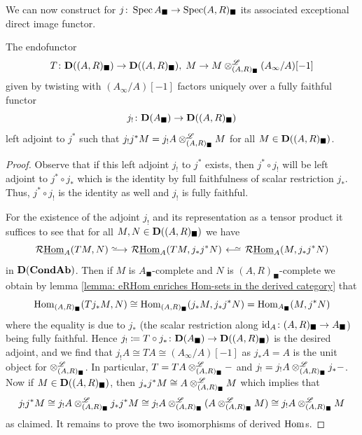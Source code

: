 We can now construct for $j\colon \operatorname{Spec} A_\blacksquare \to \operatorname{Spec} (A, R)_\blacksquare$ its associated exceptional direct image functor. 
\begin{lemma}
	\label{lemma: the left adjoint of completed scalar extension}
	
	The endofunctor
		$$T\colon {{\mathbf{D}}((A, R)_\blacksquare)}\to{{\mathbf{D}}((A, R)_\blacksquare)},\;M\to M\otimes^{\mathscr{L}}_{(A, R)_\blacksquare} (A_\infty/A)[-1]$$
	given by twisting with $(A_\infty/A)[-1]$ factors uniquely over a fully faithful functor
		$$j_!\colon {{\mathbf{D}}(A_\blacksquare)}\to{{\mathbf{D}}((A, R)_\blacksquare)}$$
	left adjoint to $j^\ast$ such that $j_! j^\ast M = j_! A \otimes^{\mathscr{L}}_{(A, R)_\blacksquare} M$ for all $M\in{{\mathbf{D}}((A, R)_\blacksquare)}$.
\end{lemma}
\begin{proof}
	Observe that if this left adjoint $j_!$ to $j^\ast$ exists, then $j^\ast\circ j_!$ will be left adjoint to $j^\ast \circ j_\ast$ which is the identity by full faithfulness of scalar restriction $j_\ast$. Thus, $j^\ast\circ j_!$ is the identity as well and $j_!$ is fully faithful.
	
	For the existence of the adjoint $j_!$ and its representation as a tensor product it suffices to see that for all $M, N \in {{\mathbf{D}}((A, R)_\blacksquare)}$ we have
		$$\eRHom_A(TM, N)\isorightarrow \eRHom_A(TM, j_\ast j^\ast N) \isoleftarrow \eRHom_A(M, j_\ast j^\ast N)$$
	in ${{\mathbf{D}}({{{\mathbf{Cond}}}{{\mathbf{Ab}}}})}$. Then if $M$ is $A_\blacksquare$-complete and $N$ is $(A, R)_\blacksquare$-complete we obtain by lemma \ref{lemma: eRHom enriches Hom-sets in the derived category} that
		$${\operatorname{Hom}}_{(A, R)_\blacksquare}(T j_\ast M, N)\cong {\operatorname{Hom}}_{(A, R)_\blacksquare}(j_\ast M, j_\ast j^\ast N) = {\operatorname{Hom}}_{A_\blacksquare}(M, j^\ast N)$$
	where the equality is due to $j_\ast$ (the scalar restriction along $\mathrm{id}_A\colon (A, R)_\blacksquare\to A_\blacksquare$) being fully faithful. Hence $j_!\coloneqq T\circ j_\ast \colon {{\mathbf{D}}(A_\blacksquare)}\to{{\mathbf{D}}((A, R)_\blacksquare)}$ is the desired adjoint, and we find that $j_! A \cong TA \cong (A_\infty/A)[-1]$ as $j_\ast A = A$ is the unit object for $\otimes^{\mathscr{L}}_{(A, R)_\blacksquare}$. In particular, $T = TA \otimes^{\mathscr{L}}_{(A, R)_\blacksquare} -$ and $j_! = j_!A \otimes^{\mathscr{L}}_{(A, R)_\blacksquare} j_\ast-$. Now if $M\in {{\mathbf{D}}((A, R)_\blacksquare)}$, then $j_\ast j^\ast M \cong A\otimes^{\mathscr{L}}_{(A, R)_\blacksquare} M$ which implies that
		$$j_!j^\ast M \cong j_!A\otimes^{\mathscr{L}}_{(A, R)_\blacksquare} j_\ast j^\ast M \cong j_!A\otimes^{\mathscr{L}}_{(A, R)_\blacksquare} (A \otimes^{\mathscr{L}}_{(A, R)_\blacksquare} M) \cong j_!A\otimes^{\mathscr{L}}_{(A, R)_\blacksquare} M$$
	as claimed. It remains to prove the two isomorphisms of derived ${\operatorname{Hom}}$s.
	

\end{proof}
